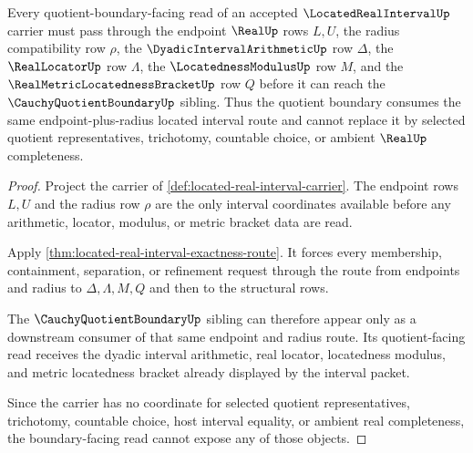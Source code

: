 \begin{theorem}
\label{thm:located-real-interval-cauchy-quotient-boundary-route}
Every quotient-boundary-facing read of an accepted $\LocatedRealIntervalUp$ carrier must pass through the endpoint $\RealUp$ rows $L,U$, the radius compatibility row $\rho$, the $\DyadicIntervalArithmeticUp$ row $\Delta$, the $\RealLocatorUp$ row $\Lambda$, the $\LocatednessModulusUp$ row $M$, and the $\RealMetricLocatednessBracketUp$ row $Q$ before it can reach the $\CauchyQuotientBoundaryUp$ sibling. Thus the quotient boundary consumes the same endpoint-plus-radius located interval route and cannot replace it by selected quotient representatives, trichotomy, countable choice, or ambient $\RealUp$ completeness.
\end{theorem}
\begin{proof}
Project the carrier of \autoref{def:located-real-interval-carrier}. The endpoint rows $L,U$ and the radius row $\rho$ are the only interval coordinates available before any arithmetic, locator, modulus, or metric bracket data are read.

Apply \autoref{thm:located-real-interval-exactness-route}. It forces every membership, containment, separation, or refinement request through the route from endpoints and radius to $\Delta,\Lambda,M,Q$ and then to the structural rows.

The $\CauchyQuotientBoundaryUp$ sibling can therefore appear only as a downstream consumer of that same endpoint and radius route. Its quotient-facing read receives the dyadic interval arithmetic, real locator, locatedness modulus, and metric locatedness bracket already displayed by the interval packet.

Since the carrier has no coordinate for selected quotient representatives, trichotomy, countable choice, host interval equality, or ambient real completeness, the boundary-facing read cannot expose any of those objects.
\end{proof}


